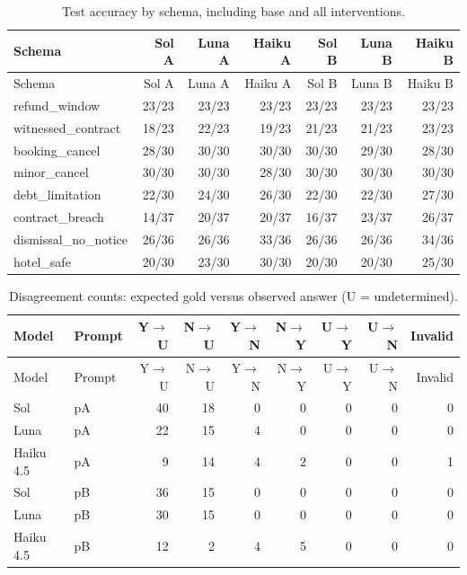 \documentclass[11pt,a4paper]{article}
\begin{document}
\begingroup\small\setlength{\tabcolsep}{4pt}
\begin{longtable}{lrrrrrr}
\caption{Test accuracy by schema, including base and all interventions.}\\
\toprule
Schema & Sol A & Luna A & Haiku A & Sol B & Luna B & Haiku B \\
\midrule\endfirsthead
\toprule
Schema & Sol A & Luna A & Haiku A & Sol B & Luna B & Haiku B \\
\midrule\endhead
\bottomrule\endfoot
refund\_window & 23/23 & 23/23 & 23/23 & 23/23 & 23/23 & 23/23 \\
witnessed\_contract & 18/23 & 22/23 & 19/23 & 21/23 & 21/23 & 23/23 \\
booking\_cancel & 28/30 & 30/30 & 30/30 & 30/30 & 29/30 & 28/30 \\
minor\_cancel & 30/30 & 30/30 & 28/30 & 30/30 & 30/30 & 30/30 \\
debt\_limitation & 22/30 & 24/30 & 26/30 & 22/30 & 22/30 & 27/30 \\
contract\_breach & 14/37 & 20/37 & 20/37 & 16/37 & 23/37 & 26/37 \\
dismissal\_no\_notice & 26/36 & 26/36 & 33/36 & 26/36 & 26/36 & 34/36 \\
hotel\_safe & 20/30 & 23/30 & 30/30 & 20/30 & 20/30 & 25/30 \\
\end{longtable}\endgroup


\begingroup\small\setlength{\tabcolsep}{4pt}
\begin{longtable}{llrrrrrrr}
\caption{Disagreement counts: expected gold versus observed answer (U = undetermined).}\\
\toprule
Model & Prompt & Y$\to$U & N$\to$U & Y$\to$N & N$\to$Y & U$\to$Y & U$\to$N & Invalid \\
\midrule\endfirsthead
\toprule
Model & Prompt & Y$\to$U & N$\to$U & Y$\to$N & N$\to$Y & U$\to$Y & U$\to$N & Invalid \\
\midrule\endhead
\bottomrule\endfoot
Sol & pA & 40 & 18 & 0 & 0 & 0 & 0 & 0 \\
Luna & pA & 22 & 15 & 4 & 0 & 0 & 0 & 0 \\
Haiku 4.5 & pA & 9 & 14 & 4 & 2 & 0 & 0 & 1 \\
Sol & pB & 36 & 15 & 0 & 0 & 0 & 0 & 0 \\
Luna & pB & 30 & 15 & 0 & 0 & 0 & 0 & 0 \\
Haiku 4.5 & pB & 12 & 2 & 4 & 5 & 0 & 0 & 0 \\
\end{longtable}\endgroup
\end{document}
